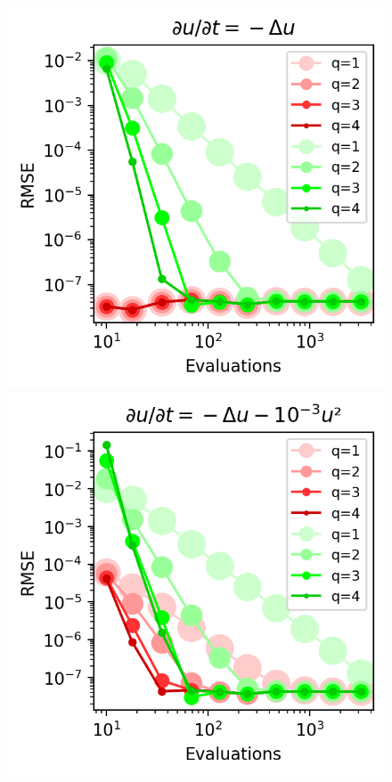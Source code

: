 \begin{figure}
    \includegraphics[width=\columnwidth]{../images/solver_heat.png}
    \caption{}
    \label{fig:heat}
    \includegraphics[width=\columnwidth]{../images/solver_heat and medium square.png}

\end{figure}
